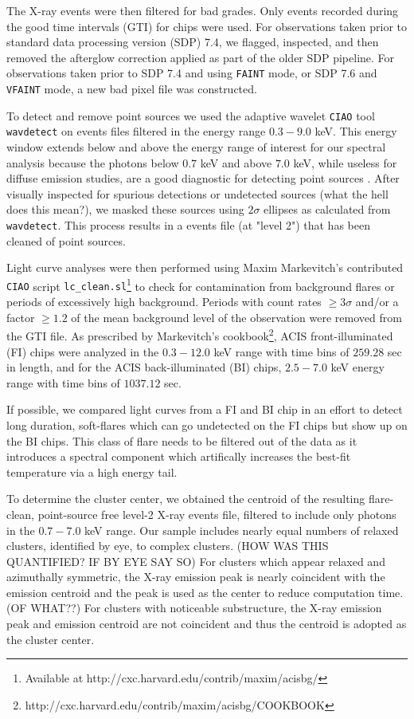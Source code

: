 \documentclass{emulateapj}
\begin{document}
The X-ray events were then filtered for bad
grades. Only events recorded during the good time intervals (GTI)
for chips were used. For
observations taken prior to standard data processing version (SDP)
7.4, we flagged, inspected, and then removed the afterglow correction
applied as part of the older SDP pipeline. For observations taken
prior to SDP 7.4 and using {\tt FAINT} mode, or SDP 7.6 and {\tt VFAINT} mode,
a new bad pixel file was constructed.

To detect and remove point sources we used the adaptive 
wavelet   {\tt CIAO} tool {\tt
wavdetect} \citep{2002ApJS..138..185F} on events files filtered in
the energy range $0.3-9.0$ keV. This energy
window extends below and above the energy range of
interest for our spectral analysis because the photons below $0.7$ keV
and above $7.0$ keV, while useless for diffuse emission studies, are a
good diagnostic for detecting point sources
\citep{2000SPIE.4012...17J}. 
After visually inspected for spurious
detections or undetected sources (what the hell does this mean?), 
we masked these sources using $2\sigma$ ellipses as calculated from
{\tt wavdetect}. This process results in a events file (at "level 2") that
has been cleaned of point sources.

Light curve analyses were then performed using Maxim Markevitch's
contributed {\tt CIAO} script {\tt lc\_clean.sl}\footnote{Available at
http://cxc.harvard.edu/contrib/maxim/acisbg/} to check for
contamination from background flares or periods of excessively high
background. Periods with count rates $\geq 3\sigma$
and/or a factor $\geq 1.2$ of the mean background level of the
observation were removed from the GTI file. As prescribed by Markevitch's
cookbook\footnote{http://cxc.harvard.edu/contrib/maxim/acisbg/COOKBOOK},
ACIS front-illuminated (FI) chips were analyzed in the $0.3-12.0$ keV range
with time bins of $259.28$ sec in length, and for the ACIS
back-illuminated (BI)
chips, $2.5-7.0$ keV energy range with time bins of $1037.12$ sec. 

If possible, we compared light curves from a FI and BI chip in an effort to
detect long duration, soft-flares which can go undetected on the FI
chips but show up on the BI chips. This class of flare needs to be
filtered out of the data as it introduces a spectral component which
artifically increases the best-fit temperature via a high energy tail.

To determine the cluster center, we obtained the centroid of the
resulting flare-clean, point-source free level-2 X-ray events file, filtered
to include only photons in the  $0.7-7.0$ keV range. Our sample includes
nearly equal numbers of relaxed clusters, identified by eye,  
to complex clusters. (HOW WAS THIS QUANTIFIED? IF BY EYE
SAY SO)
For clusters which appear
relaxed and azimuthally symmetric, the X-ray emission peak
is nearly coincident with the emission centroid and the peak is used
as the center to reduce computation time. (OF WHAT??) For clusters
with noticeable substructure, the X-ray emission peak and emission
centroid are not coincident and thus the centroid is adopted as the cluster 
center.
\end{document}
